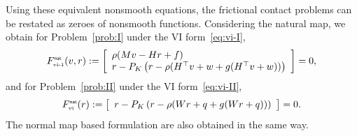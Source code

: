 Using these equivalent nonsmooth equations, the frictional contact problems can be restated as zeroes of nonsmooth functions. Considering the natural map, we obtain for Problem~\ref{prob:I} under the VI form~\eqref{eq:vi-I},
\begin{equation}
  \label{eq:natural-I}
  F_\vione^\nat(v,r) := \left[
  \begin{array}{l}
    \rho (Mv - Hr + f) \\
    r - P_{K}\left(r  - \rho (H^\top v +w  + g(H^\top v +w))\right)
  \end{array}\right] = 0,
\end{equation}
and  for Problem~\ref{prob:II} under the VI form~\eqref{eq:vi-II},
\begin{equation}
  \label{eq:natural-II}
  F_\vitwo^\nat(r) :=   \left[
  \begin{array}{l} 
    r - P_{K}\left(r  - \rho (W r +q + g(W r +q))\right) 
  \end{array}\right] 
  = 0.
\end{equation}
The normal map based formulation are also obtained in the same way. 


